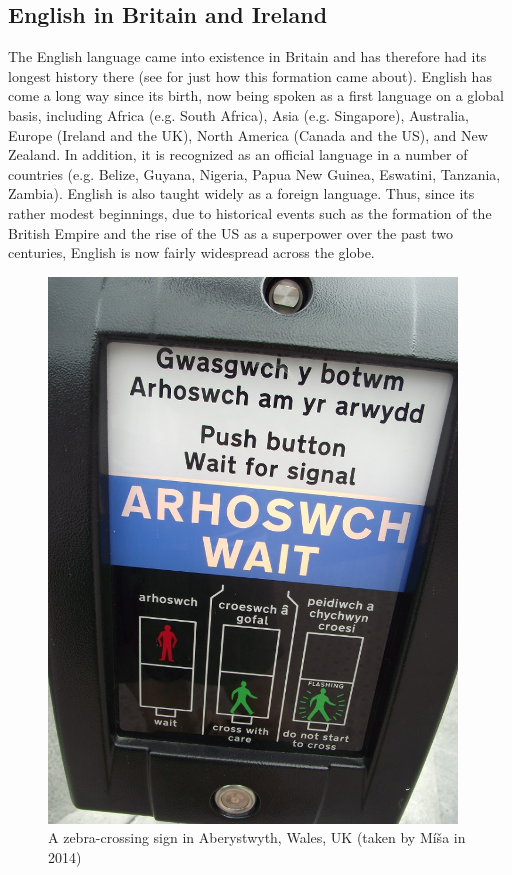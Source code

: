\subsection{English in Britain and Ireland}\label{English-BI}
The English language came into existence in Britain and has therefore had its longest history there (see  for just how this formation came about). English has come a long way since its birth, now being spoken as a first language on a global basis, including Africa (e.g. South Africa), Asia (e.g. Singapore), Australia, Europe (Ireland and the UK), North America (Canada and the US), and New Zealand. In addition, it is recognized as an official language in a number of countries (e.g. Belize, Guyana, Nigeria, Papua New Guinea, Eswatini, Tanzania, Zambia). English is also taught widely as a foreign language. Thus, since its rather modest beginnings, due to historical events such as the formation of the British Empire and the rise of the US as a superpower over the past two centuries, English is now fairly widespread across the globe.

\begin{figure}
        \centering
        \includegraphics[scale=0.78]{chapters/img/Welsh.png}
        \caption{A zebra-crossing sign in Aberystwyth, Wales, UK (taken by Míša in 2014)}
        \label{fig:Welsh}
\end{figure}

